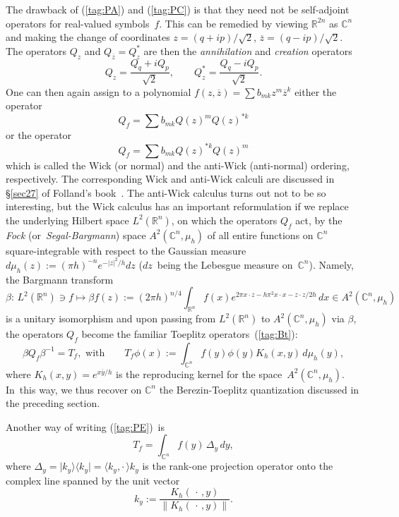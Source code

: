 \documentclass[11pt]{amsart}
\numberwithin{equation}{section}
\theoremstyle{remark}
\newcommand\spr[2]{\langle #1,#2\rangle}
\newcommand\RR{\mathbb R}
\newcommand{\be}{\begin{equation}}
\newcommand{\en}{\end{equation}}
\newcommand{\CC}{\C}
\newcommand{\C}{\mathbb C}
\begin{document}
The drawback of (\ref{tag:PA}) and (\ref{tag:PC}) is that they need not be
self-adjoint operators for real-valued symbols~$f$. This can be remedied by
viewing $\RR^{2n}$ as $\CC^n$ and making the change of coordinates $z=(q+ip)/
\sqrt2$, $\overline z=(q-ip)/\sqrt2$. The operators $Q_z$ and $Q_{\overline
z}=Q_z^*$ are then the {\sl annihilation\/} and {\sl creation\/} operators
$$ Q_z= \frac{Q_q+i Q_p}{\sqrt 2}, \qquad Q_z^*=\frac{Q_q-i Q_p}{\sqrt2}. $$
One can then again assign to a polynomial $f(z,\overline z)=\sum b_{mk} z^m
\overline z^k$ either the operator
$$ Q_f = \sum b_{mk} Q(z)^m Q(z)^{*k}  $$
or the operator
$$ Q_f = \sum b_{mk} Q(z)^{*k} Q(z)^m  $$
which is called the Wick (or normal) and the anti-Wick (anti-normal) ordering,
respectively. The corresponding Wick and anti-Wick calculi are discussed in
\S\ref{sec27} of Folland's book~\cite{bib:Foll}. The anti-Wick calculus turns
out not to be so interesting, but the Wick calculus has an important
reformulation if we replace the underlying Hilbert space $L^2(\RR^n)$, on which
the operators $Q_f$ act, by the {\sl Fock\/} (or~{\sl Segal-Bargmann\/}) space
$A^2(\CC^n,\mu_h)$ of all entire functions on $\CC^n$ square-integrable with
respect to the Gaussian measure $d\mu_h(z):=(\pi h)^{-n} e^{-|z|^2/h} dz$
($dz$~being the Lebesgue measure on~$\CC^n$). Namely, the Bargmann transform
\begin{equation}  \beta: \, L^2(\RR^n)\ni f \longmapsto \beta f(z):= (2\pi
h)^{n/4}  \int_{\RR^n} f(x) e^{2\pi x\cdot z -h \pi^2 x\cdot x -z\cdot z/2h}
\, dx \in A^2(\CC^n,\mu_h)  \label{tag:Barg}  \end{equation}
is a unitary isomorphism and upon passing from $L^2(\RR^n)$ to
$A^2(\CC^n,\mu_h)$ via $\beta$, the operators $Q_f$ become the familiar
Toeplitz operators~(\ref{tag:Bt}):
\begin{equation}  \beta Q_f \beta^{-1} = T_f, \text{ with} \qquad T_f \phi(x)
:= \int_{\CC^n} f(y) \phi(y) K_h(x,y) \, d\mu_h(y),  \label{tag:PE}
\end{equation}
where $K_h(x,y)=e^{x\overline y/h}$ is the reproducing kernel for the
space~$A^2(\CC^n,\mu_h)$. In~this way, we thus recover on $\CC^n$ the
Berezin-Toeplitz quantization discussed in the preceding section.

Another way of writing (\ref{tag:PE})~is
\begin{equation}  T_f = \int_{\CC^n} f(y) \,\Delta_y\,dy,  \label{tag:PF}
\end{equation}
where $\Delta_y=\vert k_y\rangle\langle k_y\vert =\spr{k_y}{\cdot\,}k_y$ is the
rank-one projection operator onto the complex line spanned by the unit vector
\be k_y := \frac{K_h(\,\cdot\,,y)}{\|K_h(\,\cdot\,,y)\|}.  \label{tag:KSKS} \en
\end{document}

